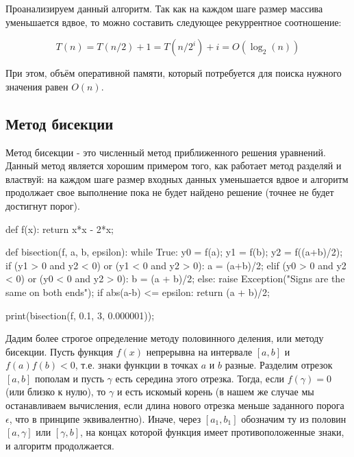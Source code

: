 Проанализируем данный алгоритм. Так как на каждом шаге 
размер массива уменьшается вдвое, то можно составить следующее 
рекуррентное соотношение:

$$T(n) = T(n/2) + 1 = T(n/2^i) + i = O(\log_2(n))$$

При этом, объём оперативной памяти, который потребуется 
для поиска нужного значения равен $O(n)$. 

\subsection{Метод бисекции}

Метод бисекции - это численный метод приближенного решения уравнений.
Данный метод является хорошим примером того, как работает метод разделяй и властвуй:
на каждом шаге размер входных данных уменьшается вдвое и алгоритм продолжает 
свое выполнение пока не будет найдено решение (точнее не будет достигнут 
порог). 

\begin{python}
def f(x):
	return x*x - 2*x;
	
def bisection(f, a, b, epsilon):
	while True:
		y0 = f(a);
		y1 = f(b);
		y2 = f((a+b)/2);
		if (y1 > 0 and y2 < 0) or (y1 < 0 and y2 > 0):
			a = (a+b)/2;
		elif (y0 > 0 and y2 < 0) or (y0 < 0 and y2 > 0):
			b = (a + b)/2;
		else:
			raise Exception("Signs are the same on both ends");
		if abs(a-b) <= epsilon:
			return (a + b)/2;

print(bisection(f, 0.1, 3, 0.000001));
\end{python}

Дадим более строгое определение методу половинного 
деления, или методу бисекции. Пусть функция $f(x)$ непрерывна
на интервале $[a, b]$ и $f(a)f(b)<0$, т.е. знаки функции
в точках $a$ и $b$ разные. Разделим отрезок $[a, b]$ пополам
и пусть $\gamma$ есть середина этого отрезка. Тогда, если
$f(\gamma) = 0$ (или близко к нулю), то $\gamma$ и есть
искомый корень (в нашем же случае мы останавливаем вычисления,
если длина нового отрезка меньше заданного порога $\epsilon$, что в принципе
эквивалентно). Иначе, через $[a_1, b_1]$ обозначим ту из половин
$[a, \gamma]$ или $[\gamma, b]$, на концах которой функция имеет
противоположенные знаки, и алгоритм продолжается.


